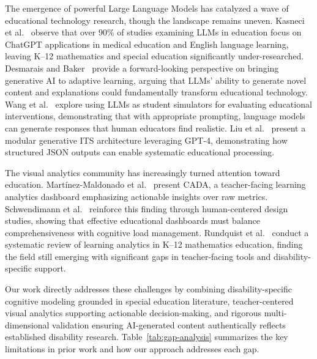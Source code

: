 \documentclass[11pt]{article}
\begin{document}
The emergence of powerful Large Language Models has catalyzed a wave of educational technology research, though the landscape remains uneven. Kasneci et al.~\cite{ref16} observe that over 90\% of studies examining LLMs in education focus on ChatGPT applications in medical education and English language learning, leaving K--12 mathematics and special education significantly under-researched. Desmarais and Baker~\cite{ref15} provide a forward-looking perspective on bringing generative AI to adaptive learning, arguing that LLMs' ability to generate novel content and explanations could fundamentally transform educational technology. Wang et al.~\cite{ref18} explore using LLMs as student simulators for evaluating educational interventions, demonstrating that with appropriate prompting, language models can generate responses that human educators find realistic. Liu et al.~\cite{ref19} present a modular generative ITS architecture leveraging GPT-4, demonstrating how structured JSON outputs can enable systematic educational processing.

The visual analytics community has increasingly turned attention toward education. Mart\'inez-Maldonado et al.~\cite{ref24} present CADA, a teacher-facing learning analytics dashboard emphasizing actionable insights over raw metrics. Schwendimann et al.~\cite{ref25} reinforce this finding through human-centered design studies, showing that effective educational dashboards must balance comprehensiveness with cognitive load management. Rundquist et al.~\cite{ref26} conduct a systematic review of learning analytics in K--12 mathematics education, finding the field still emerging with significant gaps in teacher-facing tools and disability-specific support.

Our work directly addresses these challenges by combining disability-specific cognitive modeling grounded in special education literature, teacher-centered visual analytics supporting actionable decision-making, and rigorous multi-dimensional validation ensuring AI-generated content authentically reflects established disability research. Table~\ref{tab:gap-analysis} summarizes the key limitations in prior work and how our approach addresses each gap.
\end{document}

